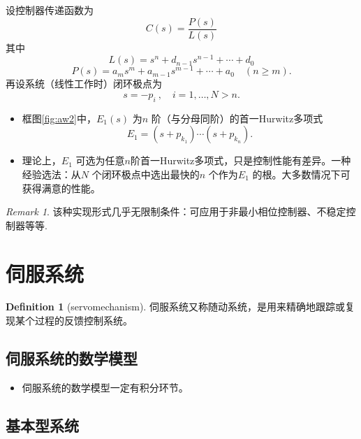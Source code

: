 \documentclass[14pt,a4paper]{article}
\theoremstyle{plain}
\theoremstyle{definition}
\newtheorem*{dfn}{Definition}
\theoremstyle{remark}
\newtheorem{rmk}{Remark}[section]
\theoremstyle{plain}
\theoremstyle{plain}
\theoremstyle{definition}
\begin{document}
			设控制器传递函数为
				\[
					C(s) = \dfrac{P(s)}{L(s)} 
				\]
				其中
				 \[
					L(s) = s^{n} +d_{n-1}s^{n-1} + \cdots + d_0	
				 \]
				 \[
					 P(s) = a_{m}s^{m} + a_{m-1}s^{m-1} + \cdots + a_0 \quad \left( n\ge m \right) 
				 .\] 
				 再设系统（线性工作时）闭环极点为
				 \[
				 s = -p_i \ , \quad i=1,\ldots ,N > n
				 .\] 

				\begin{itemize}
					\item 框图\ref{fig:aw2}中，$E_1(s)$ 为$n$ 阶（与分母同阶）的首一Hurwitz多项式 
						\[
							E_1 = (s+p_{k_1})\cdots (s+p_{k_n}) 
						.\] 
					\item 理论上，$E_1$ 可选为任意$n$阶首一Hurwitz多项式，只是控制性能有差异。一种经验选法：从$N$ 个闭环极点中选出最快的$n$ 个作为$E_1$ 的根。大多数情况下可获得满意的性能。
				\end{itemize} 

				\begin{rmk}  
					该种实现形式几乎无限制条件：可应用于非最小相位控制器、不稳定控制器等等. 
				\end{rmk} 


	\newpage
	\section{伺服系统}%
	\label{sec:伺服系统}

		\begin{dfn}[servomechanism]  
		\label{dfn:servomechanism}
			伺服系统又称随动系统，是用来精确地跟踪或复现某个过程的反馈控制系统。
		\end{dfn} 
	
		\subsection{伺服系统的数学模型}%
		\label{sub:伺服系统的数学模型}
		
			\begin{itemize}
				\item 伺服系统的数学模型一定有积分环节。
			\end{itemize}  

		\subsection{基本\uppercase\expandafter{}型系统}%
		\label{sub:基本I型系统}
	
\end{document}
